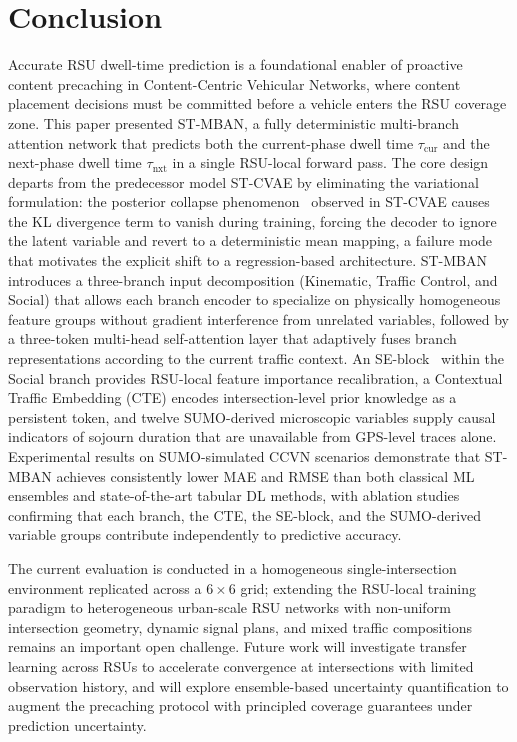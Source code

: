 \documentclass[journal]{IEEEtran}
\begin{document}
\section{Conclusion} \label{sec:conclusion}

Accurate RSU dwell-time prediction is a foundational enabler of proactive content precaching in Content-Centric Vehicular Networks, where content placement decisions must be committed before a vehicle enters the RSU coverage zone.
This paper presented ST-MBAN, a fully deterministic multi-branch attention network that predicts both the current-phase dwell time $\tau_\text{cur}$ and the next-phase dwell time $\tau_\text{nxt}$ in a single RSU-local forward pass.
The core design departs from the predecessor model ST-CVAE by eliminating the variational formulation: the posterior collapse phenomenon~\cite{posteriorCollapse} observed in ST-CVAE causes the KL divergence term to vanish during training, forcing the decoder to ignore the latent variable and revert to a deterministic mean mapping, a failure mode that motivates the explicit shift to a regression-based architecture.
ST-MBAN introduces a three-branch input decomposition (Kinematic, Traffic Control, and Social) that allows each branch encoder to specialize on physically homogeneous feature groups without gradient interference from unrelated variables, followed by a three-token multi-head self-attention layer that adaptively fuses branch representations according to the current traffic context.
An SE-block~\cite{Hu2018SENet} within the Social branch provides RSU-local feature importance recalibration, a Contextual Traffic Embedding (CTE) encodes intersection-level prior knowledge as a persistent token, and twelve SUMO-derived microscopic variables supply causal indicators of sojourn duration that are unavailable from GPS-level traces alone.
Experimental results on SUMO-simulated CCVN scenarios demonstrate that ST-MBAN achieves consistently lower MAE and RMSE than both classical ML ensembles and state-of-the-art tabular DL methods, with ablation studies confirming that each branch, the CTE, the SE-block, and the SUMO-derived variable groups contribute independently to predictive accuracy.

The current evaluation is conducted in a homogeneous single-intersection environment replicated across a $6{\times}6$ grid; extending the RSU-local training paradigm to heterogeneous urban-scale RSU networks with non-uniform intersection geometry, dynamic signal plans, and mixed traffic compositions remains an important open challenge.
Future work will investigate transfer learning across RSUs to accelerate convergence at intersections with limited observation history, and will explore ensemble-based uncertainty quantification to augment the precaching protocol with principled coverage guarantees under prediction uncertainty.
\end{document}
